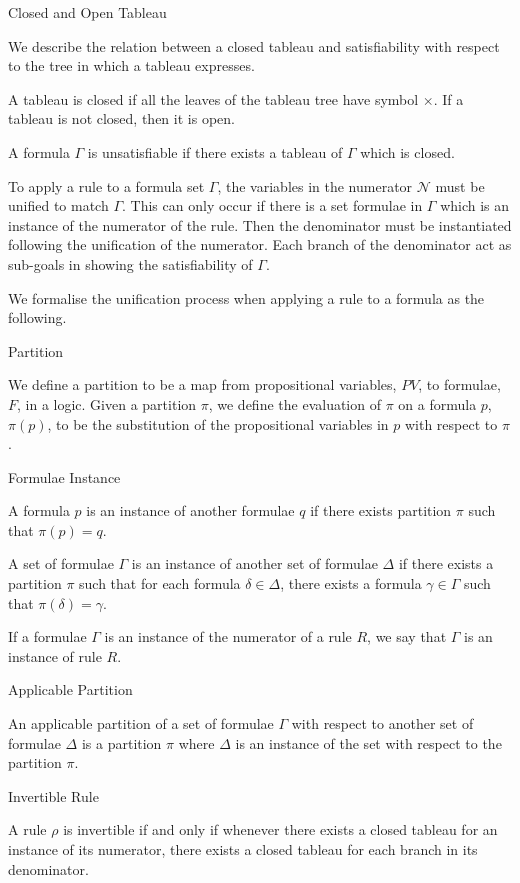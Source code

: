 \documentclass{llncs}
\begin{document}
\begin{definition}{Closed and Open Tableau}

We describe the relation between a closed tableau and satisfiability with
respect to the tree in which a tableau expresses.

A tableau is closed if all the leaves of the tableau tree have symbol $\times$.
If a tableau is not closed, then it is open.
\end{definition}
\begin{definition}

A formula $\Gamma$ is unsatisfiable if there exists a tableau of $\Gamma$ which
is closed.
\end{definition}
To apply a rule to a formula set $\Gamma$, the variables in the numerator
$\mathcal{N}$ must be unified to match $\Gamma$. This can only occur if there
is a set formulae in $\Gamma$ which is an instance of the numerator of the
rule. Then the denominator must be instantiated following the unification of
the numerator. Each branch of the denominator act as sub-goals in showing the
satisfiability of $\Gamma$.

We formalise the unification process when applying a rule to a formula as the
following.
\begin{definition}{Partition}\label{Partition}

We define a partition to be a map from propositional variables, $PV$, to
formulae, $F$, in a logic. Given a partition $\pi$, we define the evaluation of
$\pi$ on a formula $p$, $\pi(p)$, to be the substitution of the propositional
variables in $p$ with respect to $\pi$.
\end{definition}
\begin{definition}{Formulae Instance}\label{Formulae Instance}

A formula $p$ is an instance of another formulae $q$ if there exists partition
$\pi$ such that $\pi(p) = q$.

A set of formulae $\Gamma$ is an instance of another set of formulae
$\Delta$ if there exists a partition $\pi$ such that for each formula $\delta
\in \Delta$, there exists a formula $\gamma \in \Gamma$ such that $\pi(\delta)
= \gamma$.

If a formulae $\Gamma$ is an instance of the numerator of a rule $R$, we say
that $\Gamma$ is an instance of rule $R$.
\end{definition}
\begin{definition}{Applicable Partition}\label{Applicable Partition}

An applicable partition of a set of formulae $\Gamma$ with respect to another
set of formulae $\Delta$ is a partition $\pi$ where $\Delta$ is an instance of
the set with respect to the partition $\pi$.
\end{definition}
\begin{definition}{Invertible Rule}\label{Invertible Rule}

A rule $\rho$ is invertible if and only if whenever there exists a closed
tableau for an instance of its numerator, there exists a closed tableau for
each branch in its denominator.
\end{definition}
%
\end{document}

